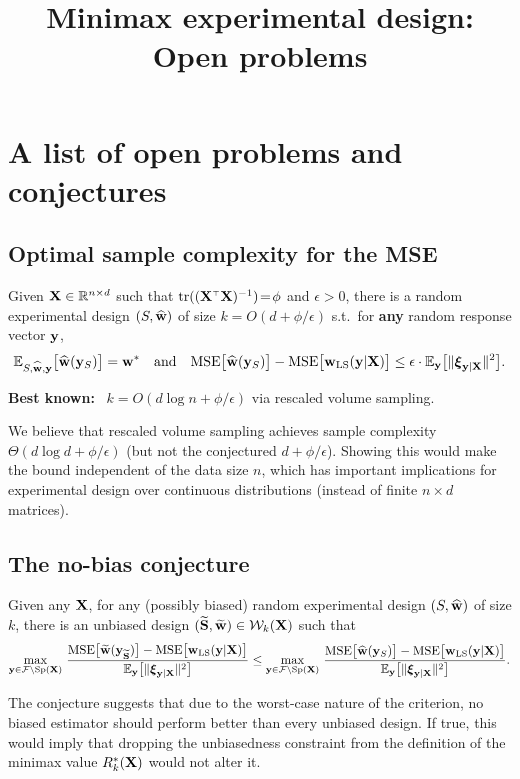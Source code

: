 \documentclass[12pt]{../sty/colt2019/colt2018-arxiv}
\title{Minimax experimental design: Open problems}
\begin{document}
\maketitle


\section{A list of open problems and conjectures}

\subsection{Optimal sample complexity for the MSE}
\begin{conjecture}
  Given $\mathbf X\in\mathbb R^{n\times d}$ such that 
$\tr((\X^\top\X)^{-1})\!=\!\phi$ and $\epsilon>0$, there is a
random experimental design $(S,\widehat{\mathbf w})$
of size $k=O(d+\phi/\epsilon)$ s.t.~for \textbf{any} random
response vector $\mathbf y$, 
\begin{align*}
\E_{S,\wbh,\y}\big[\wbh(\y_S)\big]=\w^*\quad\text{and}\quad
  \mathrm{MSE}\big[\wbh(\y_S)\big] - \mathrm{MSE}\big[\wols(\y|\X)\big]
  \leq \epsilon\cdot 
  \E_\y\big[\|\xib_{\y|\X}\|^2\big].%
\end{align*}
\end{conjecture}
\textbf{Best known:} \ $k=O(d\log n + \phi/\epsilon)$ via rescaled volume sampling.

We believe that rescaled volume sampling achieves sample complexity $\Theta(d\log d+\phi/\epsilon)$ (but not the conjectured $d+\phi/\epsilon$). Showing this would make the bound independent of the data size $n$, which has important implications for experimental design over continuous distributions (instead of finite $n\times d$ matrices).

\subsection{The no-bias conjecture}
\begin{conjecture}
  Given any $\mathbf X$, for any (possibly biased) random experimental design $(S,\widehat{\mathbf w})$ of size $k$, there is an unbiased design $(\widetilde{\mathbf{S}},\widetilde{\mathbf w})\in\mathcal{W}_k(\mathbf X)$ such that
  \begin{align*}
    \max_{\mathbf y\in\mathcal{F}\backslash\mathrm{Sp}(\mathbf X)}\,\frac{\mathrm{MSE}\big[\widetilde{\mathbf w}(\mathbf y_{\widetilde{\mathbf{S}}})\big]-
    \mathrm{MSE}\big[\mathbf w_{\mathrm{LS}}(\mathbf y|\mathbf X)\big]
    }{\mathbb E_\mathbf y\big[\|\boldsymbol\xi_{\mathbf y|\mathbf X}\|^2\big]}\leq     \max_{\mathbf y\in\mathcal{F}\backslash\mathrm{Sp}(\mathbf X)}\,\frac{\mathrm{MSE}\big[\widehat{\mathbf w}(\mathbf y_S)\big]-
    \mathrm{MSE}\big[\mathbf w_{\mathrm{LS}}(\mathbf y|\mathbf X)\big]
    }{\mathbb E_\mathbf y\big[\|\boldsymbol\xi_{\mathbf y|\mathbf X}\|^2\big]}.
  \end{align*}
\end{conjecture}
The conjecture suggests that due to the worst-case nature of the criterion, no biased estimator should perform better than every unbiased design. If true, this would imply that dropping the unbiasedness constraint from the definition of the minimax value $R_k^*(\mathbf X)$ would not alter it.
\end{document}
